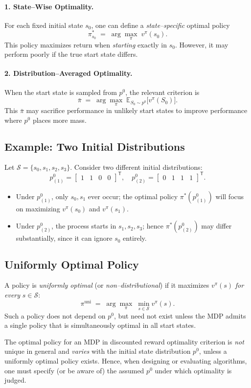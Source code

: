 \paragraph{1. State–Wise Optimality.}
For each fixed initial state $s_0$, one can define a \emph{state–specific} optimal policy
\[
\pi^*_{s_0}
\;=\;
\arg\max_{\pi}\;v^\pi(s_0).
\]
This policy maximizes return when \emph{starting} exactly in $s_0$. However, it may perform poorly if the true start state differs.

\paragraph{2. Distribution–Averaged Optimality.}
When the start state is sampled from $p^0$, the relevant criterion is
\[
\bar\pi
\;=\;
\arg\max_{\pi}\;\mathbb{E}_{S_0\sim p^0}\!\bigl[v^\pi(S_0)\bigr].
\]
This $\bar\pi$ may sacrifice performance in unlikely start states to improve performance where $p^0$ places more mass.

\subsection{Example: Two Initial Distributions}
Let $\mathcal{S}=\{s_0,s_1,s_2,s_3\}$. Consider two different initial distributions:
\[
p^0_{(1)}
=\begin{bmatrix}1 & 1 & 0 & 0\end{bmatrix}^\mathsf{T}, 
\quad
p^0_{(2)}
=\begin{bmatrix}0 & 1 & 1 & 1\end{bmatrix}^\mathsf{T}.
\]
\begin{itemize}
  \item Under $p^0_{(1)}$, only $s_0,s_1$ ever occur; the optimal policy $\pi^*(p^0_{(1)})$ will focus on maximizing $v^\pi(s_0)$ and $v^\pi(s_1)$.
  \item Under $p^0_{(2)}$, the process starts in $s_1,s_2,s_3$; hence $\pi^*(p^0_{(2)})$ may differ substantially, since it can ignore $s_0$ entirely.
\end{itemize}

\subsection{Uniformly Optimal Policy}
A policy is \emph{uniformly optimal} (or \emph{non–distributional}) if it maximizes $v^\pi(s)$ \emph{for every} $s\in\mathcal{S}$:
\[
\pi^{\mathrm{uni}}
\;=\;
\arg\max_{\pi}\;\min_{s\in\mathcal{S}} v^\pi(s).
\]
Such a policy does not depend on $p^0$, but need not exist unless the MDP admits a single policy that is simultaneously optimal in all start states.

\bigskip
The optimal policy for an MDP in discounted reward optimality criterion is \emph{not} unique in general and \emph{varies} with the initial state distribution $p^0$, unless a uniformly optimal policy exists. Hence, when designing or evaluating algorithms, one must specify (or be aware of) the assumed $p^0$ under which optimality is judged.





